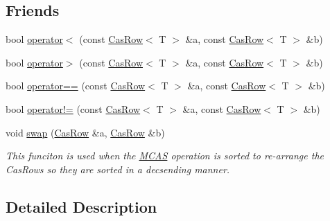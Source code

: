 \subsection*{Friends}
\begin{DoxyCompactItemize}
\item 
bool \hyperlink{classtervel_1_1algorithms_1_1wf_1_1mcas_1_1_cas_row_a83e942681a1ebe69e69f7fedf93cc89f}{operator$<$} (const \hyperlink{classtervel_1_1algorithms_1_1wf_1_1mcas_1_1_cas_row}{Cas\+Row}$<$ T $>$ \&a, const \hyperlink{classtervel_1_1algorithms_1_1wf_1_1mcas_1_1_cas_row}{Cas\+Row}$<$ T $>$ \&b)
\item 
bool \hyperlink{classtervel_1_1algorithms_1_1wf_1_1mcas_1_1_cas_row_a614f8a40786b7bb3223b08f56013228e}{operator$>$} (const \hyperlink{classtervel_1_1algorithms_1_1wf_1_1mcas_1_1_cas_row}{Cas\+Row}$<$ T $>$ \&a, const \hyperlink{classtervel_1_1algorithms_1_1wf_1_1mcas_1_1_cas_row}{Cas\+Row}$<$ T $>$ \&b)
\item 
bool \hyperlink{classtervel_1_1algorithms_1_1wf_1_1mcas_1_1_cas_row_abfebad601d55fa9ccd25347967c3fdf4}{operator==} (const \hyperlink{classtervel_1_1algorithms_1_1wf_1_1mcas_1_1_cas_row}{Cas\+Row}$<$ T $>$ \&a, const \hyperlink{classtervel_1_1algorithms_1_1wf_1_1mcas_1_1_cas_row}{Cas\+Row}$<$ T $>$ \&b)
\item 
bool \hyperlink{classtervel_1_1algorithms_1_1wf_1_1mcas_1_1_cas_row_a5c80c15327d420ec6bc5ab9dcf51d71e}{operator!=} (const \hyperlink{classtervel_1_1algorithms_1_1wf_1_1mcas_1_1_cas_row}{Cas\+Row}$<$ T $>$ \&a, const \hyperlink{classtervel_1_1algorithms_1_1wf_1_1mcas_1_1_cas_row}{Cas\+Row}$<$ T $>$ \&b)
\item 
void \hyperlink{classtervel_1_1algorithms_1_1wf_1_1mcas_1_1_cas_row_a5b373a53721ccf837fb585df65a585ff}{swap} (\hyperlink{classtervel_1_1algorithms_1_1wf_1_1mcas_1_1_cas_row}{Cas\+Row} \&a, \hyperlink{classtervel_1_1algorithms_1_1wf_1_1mcas_1_1_cas_row}{Cas\+Row} \&b)
\begin{DoxyCompactList}\small\item\em This funciton is used when the \hyperlink{classtervel_1_1algorithms_1_1wf_1_1mcas_1_1_m_c_a_s}{M\+C\+A\+S} operation is sorted to re-\/arrange the Cas\+Rows so they are sorted in a decsending manner. \end{DoxyCompactList}\end{DoxyCompactItemize}


\subsection{Detailed Description}
